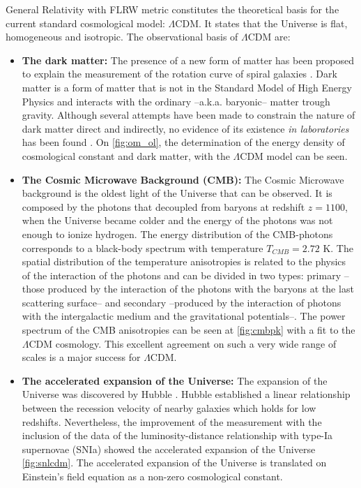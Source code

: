 General Relativity with FLRW metric constitutes the theoretical basis for the current standard cosmological model: $\Lambda$CDM. It states that the Universe is flat, homogeneous and isotropic. The observational basis of $\Lambda$CDM are:
\begin{itemize}
\item {\bf The dark matter:} The presence of a new form of matter has been proposed to explain the measurement of the rotation curve of spiral galaxies \cite{1982ApJ...253...70B,1983Sci...220.1339R,1985ApJ...297..423B,1985ApJ...289...81R}. Dark matter is a form of matter that is not in the Standard Model of High Energy Physics and interacts with the ordinary --a.k.a. baryonic-- matter trough gravity. Although several attempts have been made to constrain the nature of dark matter direct and indirectly, no evidence of its existence {\it in laboratories} has been found  \cite{2016JPhG...43a3001M,2016ConPh..57..496G}. On \autoref{fig:om_ol}, the determination of the energy density of cosmological constant and dark matter, with the $\Lambda$CDM model can be seen.

\item {\bf The Cosmic Microwave Background (CMB):} The Cosmic Microwave background is the oldest light of the Universe that can be observed. It is composed by the photons that decoupled from baryons at redshift $z=1100$, when the Universe became colder and the energy of the photons was not enough to ionize hydrogen. The energy distribution of the CMB-photons corresponds to a black-body spectrum with temperature $T_{CMB}=2.72$ K. The spatial distribution of the temperature anisotropies is related to the physics of the interaction of the photons and can be divided in two types: primary --those produced by the interaction of the photons with the baryons at the last scattering surface-- and secondary --produced by the interaction of photons with the intergalactic medium and the gravitational potentials--. The power spectrum of the CMB anisotropies can be seen at \autoref{fig:cmbpk} with a fit to the $\Lambda$CDM cosmology. This excellent agreement on such a very wide range of scales is a major success for $\Lambda$CDM.

\item {\bf The accelerated expansion of the Universe:} The expansion of the Universe was discovered by Hubble \cite{1929PNAS...15..168H}. Hubble established a linear relationship between the recession velocity of nearby galaxies which holds for low redshifts. Nevertheless, the improvement of the measurement with the inclusion of the data of the luminosity-distance relationship with type-Ia supernovae (SNIa) showed the accelerated expansion of the Universe \cite{1999ApJ...517..565P} \autoref{fig:snlcdm}. The accelerated expansion of the Universe is translated on Einstein's field equation as a non-zero cosmological constant.


\end{itemize}
